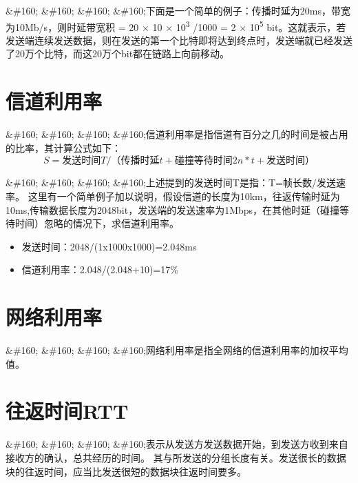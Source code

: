 \&\#160; \&\#160; \&\#160; \&\#160;下面是一个简单的例子：传播时延为20ms，带宽为10Mb\slash s，则时延带宽积 = 20 × 10 × 10\textsuperscript{3} \slash 1000 = 2 × 10\textsuperscript{5} bit。这就表示，若发送端连续发送数据，则在发送的第一个比特即将达到终点时，发送端就已经发送了20万个比特，而这20万个bit都在链路上向前移动。

\section{信道利用率}
\label{信道利用率}

\&\#160; \&\#160; \&\#160; \&\#160;信道利用率是指信道有百分之几的时间是被占用的比率，其计算公式如下：
$$S=发送时间T /（传播时延t+碰撞等待时间2n*t+发送时间）$$

\&\#160; \&\#160; \&\#160; \&\#160;上述提到的发送时间T是指：T=帧长数\slash 发送速率。
这里有一个简单例子加以说明，假设信道的长度为10km，往返传输时延为10ms,传输数据长度为2048bit，发送端的发送速率为1Mbps，在其他时延（碰撞等待时间）忽略的情况下，求信道利用率。

\begin{itemize}
\item 发送时间：2048\slash (1x1000x1000)=2.048ms

\item 信道利用率：2.048\slash (2.048+10)=17\%

\end{itemize}

\section{网络利用率}
\label{网络利用率}

\&\#160; \&\#160; \&\#160; \&\#160;网络利用率是指全网络的信道利用率的加权平均值。

\section{往返时间RTT}
\label{往返时间rtt}

\&\#160; \&\#160; \&\#160; \&\#160;表示从发送方发送数据开始，到发送方收到来自接收方的确认，总共经历的时间。
其与所发送的分组长度有关。发送很长的数据块的往返时间，应当比发送很短的数据块往返时间要多。
